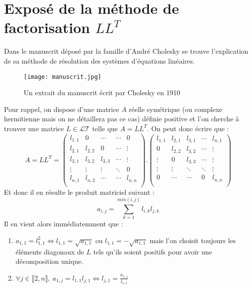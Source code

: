 \documentclass[a4paper, titlepage]{livret}													%
\begin{document}
	\section{Exposé de la méthode de factorisation $LL^{T}$}
		Dans le manuscrit déposé par la famille d'André Cholesky se trouve l'explication de sa méthode de résolution des systèmes d'équations linéaires.

		\begin{figure}[!ht]
			\centering
  				\texttt{[image: manuscrit.jpg]}
  				\caption{Un extrait du manuscrit écrit par Cholesky en 1910}
		\end{figure}
		
		Pour rappel, on dispose d'une matrice $A$ réelle symétrique (ou complexe hermitienne mais on ne détaillera pas ce cas) définie positive et l'on cherche à trouver une matrice $L \in \mathcal{LT}$ telle que $A = LL^{T}$.
		On peut donc écrire que :
			\[
				A = LL^{T} = 
				\begin{pmatrix}
					l_{1,1} & 0 & \cdots & \cdots & 0\\
					l_{2,1} & l_{2,2} & 0 & \cdots& \vdots \\
					l_{3,1} & l_{3,2} & l_{3, 3} & \cdots & \vdots \\
					\vdots& \vdots & \vdots & \ddots & 0 \\
					l_{n,1} & l_{n,2} & \cdots & \cdots & l_{n,n}\\
				\end{pmatrix} .
				\begin{pmatrix}
					l_{1,1} & l_{2,1} & l_{3,1} & \cdots & l_{n, 1}\\
					0 & l_{2,2} & l_{3, 2} & \cdots & \vdots \\
					\vdots & 0 & l_{3,3} & \cdots & \vdots \\
					\vdots & \vdots & \ddots & \ddots & \vdots \\
					0 & \cdots & \cdots & 0 & l_{n,n}\\
				\end{pmatrix}
			\]
		Et donc il en résulte le produit matriciel suivant :
			\[
				a_{i,j} = \sum_{k = 1}^{min(i,j)} l_{i,k}l_{j,k}
			\]
		Il en vient alors immédiatemment que :
		\begin{enumerate}
			\item 
				$
					a_{1,1} = l_{1,1}^{2} \Leftrightarrow l_{1,1} = \sqrt{a_{1,1}}
				$
				ou
				$
					l_{1,1} = -\sqrt{a_{1,1}}
				$
				mais l'on choisit toujours les éléments diagonaux de $L$ tels qu'ils soient positifs pour avoir une décomposition unique.
			\item
				$
					\forall j \in \llbracket 2,n \rrbracket, \  a_{1,j} = l_{1,1}l_{j,1} \Leftrightarrow l_{j,1} = \frac{a_{1,j}}{l_{1,1}} 
				$
		\end{enumerate}	
\end{document}
